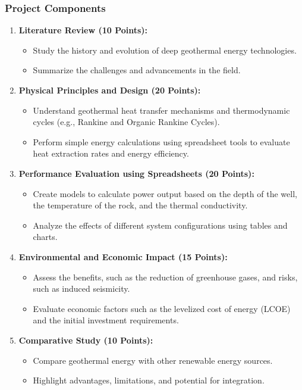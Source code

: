 \documentclass[11pt]{article}
\begin{document}
\subsubsection*{Project Components}
\begin{enumerate}
    \item \textbf{Literature Review (10 Points):}
    \begin{itemize}
        \item Study the history and evolution of deep geothermal energy technologies.
        \item Summarize the challenges and advancements in the field.
    \end{itemize}

    \item \textbf{Physical Principles and Design (20 Points):}
    \begin{itemize}
        \item Understand geothermal heat transfer mechanisms and thermodynamic cycles (e.g., Rankine and Organic Rankine Cycles).
        \item Perform simple energy calculations using spreadsheet tools to evaluate heat extraction rates and energy efficiency.
    \end{itemize}

    \item \textbf{Performance Evaluation using Spreadsheets (20 Points):}
    \begin{itemize}
        \item Create models to calculate power output based on the depth of the well, the temperature of the rock, and the thermal conductivity.
        \item Analyze the effects of different system configurations using tables and charts.
    \end{itemize}

    \item \textbf{Environmental and Economic Impact (15 Points):}
    \begin{itemize}
        \item Assess the benefits, such as the reduction of greenhouse gases, and risks, such as induced seismicity.
        \item Evaluate economic factors such as the levelized cost of energy (LCOE) and the initial investment requirements.
    \end{itemize}

    \item \textbf{Comparative Study (10 Points):}
    \begin{itemize}
        \item Compare geothermal energy with other renewable energy sources.
        \item Highlight advantages, limitations, and potential for integration.
    \end{itemize}


\end{enumerate}
\end{document}
